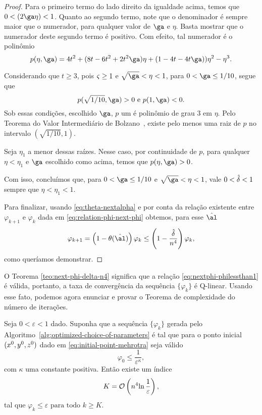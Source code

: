 \begin{proof}
	Para o primeiro termo do lado direito da igualdade acima, temos que $0 < (2\ga\eta) <1$.
	Quanto ao segundo termo, note que o denominador é  sempre maior que o numerador, para qualquer  valor de $\ga$ e $\eta$. Basta mostrar que  o numerador deste segundo termo  é positivo. Com efeito, tal numerador é o polinômio 
	\[
		p(\eta,\ga) =  4 t^2 + ( 8t - 6t^2 + 2t^2\ga) \eta + (1 - 4t - 4t   \ga) ) \eta^2 - \eta^3. 
	\]

	Considerando que $t\geq3$, pois $\varsigma\geq1$ e $\sqrt{\ga}<\eta<1$, para $0 < \ga \leq 1/10$, segue que
	\[p(\sqrt{1/10},\ga) >0 \text{ e  } p(1,\ga) <0.\]
	Sob essas condições, escolhido $\ga$,  $p$ um é polinômio de grau 3 em $\eta$. Pelo Teorema do Valor Intermediário de Bolzano~\cite[Teorema 5.3.7]{Bartle:2011tr},  existe pelo menos uma  raiz  de $p$ no intervalo $(\sqrt{1/10},1)$. 

	Seja $\eta_{1}$ a menor dessas raízes. Nesse caso, por continuidade de $p$, para qualquer $\eta  < \eta_{1}$ e $\ga$ escolhido como acima, temos que  $p(\eta,\ga) >0$. 

	Com isso, concluímos que,  para $0 < \ga \leq 1/10$ e  $\sqrt{\ga}<\eta<1$, vale  $0<\hat{\delta}<1$  sempre que $\eta < \eta_{1} < 1$.

	Para finalizar, usando \eqref{eq:theta-nextalpha} e por conta da relação existente entre $\varphi_{k+1}$ e $\varphi_{k}$ dada em   \eqref{eq:relation-phi-next-phi} obtemos, para esse $\nextal$
	\[
	\varphi_{k+1}= \left(1 - \theta(\nextal)\right)\varphi_{k} \leq 
	\left(1 - \frac{\hat{\delta}}{n^{4}}\right)\varphi_{k},
	\]
como queríamos demonstrar.
	\end{proof}



O Teorema \ref{teo:next-phi-delta-n4} significa que a relação \eqref{eq:nextphi-philessthan1}
é válida, portanto, a taxa de convergência da sequência $\{\varphi_{k}\}$ é  Q-linear. Usando esse fato, podemos agora enunciar e provar o Teorema de complexidade do número de iterações. 


\begin{teo}
	\label{teo:alg-convergence-varphi} Seja $0 < \varepsilon <1$ dado. Suponha que a sequência $\{\varphi_{k}\}$ gerada pelo Algoritmo~\ref{alg:optimized-choice-of-parameters} é  tal que 
	para o ponto inicial $(x^0,y^0,z^0)$ dado em \eqref{eq:initial-point-mehrotra} seja válido	
	\begin{equation}
	\label{eq:varphi0-eps-kappa}
		\varphi_{0}\leq \dfrac{1}{\varepsilon^{\kappa}},
	\end{equation} 
	com  $\kappa$ uma constante positiva. Então  existe um índice \[K =  \mathcal{O}\left(n^{4}{\ln\frac{1}{\varepsilon}}\right),\] tal que 
	 $\varphi_{k}\leq \varepsilon \text{ para todo } k \geq K$.
	 
\end{teo}


